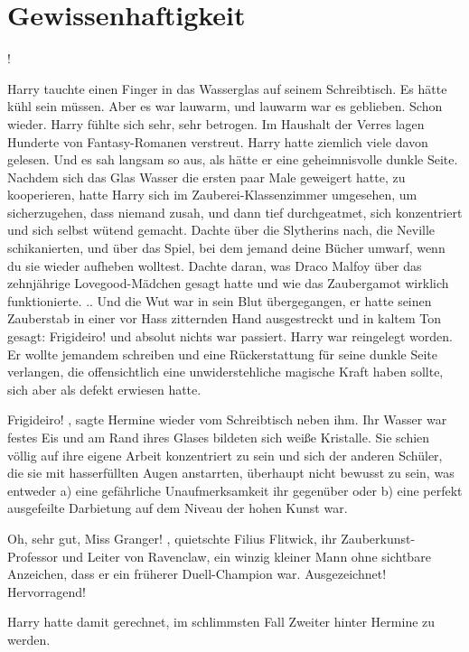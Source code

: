 \chapter{Gewissenhaftigkeit}

!\grqq{}

Harry tauchte einen Finger in das Wasserglas auf seinem Schreibtisch. Es hätte
kühl sein müssen. Aber es war lauwarm, und lauwarm war es geblieben. Schon
wieder. Harry fühlte sich sehr, sehr betrogen. Im Haushalt der Verres lagen
Hunderte von Fantasy-Romanen verstreut. Harry hatte ziemlich viele davon
gelesen. Und es sah langsam so aus, als hätte er eine geheimnisvolle dunkle
Seite. Nachdem sich das Glas Wasser die ersten paar Male geweigert hatte, zu
kooperieren, hatte Harry sich im Zauberei-Klassenzimmer umgesehen, um
sicherzugehen, dass niemand zusah, und dann tief durchgeatmet, sich konzentriert
und sich selbst wütend gemacht. Dachte über die Slytherins nach, die Neville
schikanierten, und über das Spiel, bei dem jemand deine Bücher umwarf, wenn du
sie wieder aufheben wolltest. Dachte daran, was Draco Malfoy über das
zehnjährige Lovegood-Mädchen gesagt hatte und wie das Zaubergamot wirklich
funktionierte. .. Und die Wut war in sein Blut übergegangen, er hatte seinen
Zauberstab in einer vor Hass zitternden Hand ausgestreckt und in kaltem Ton
gesagt: \glqq Frigideiro!\grqq{} und absolut nichts war passiert. Harry war
reingelegt worden. Er wollte jemandem schreiben und eine Rückerstattung für
seine dunkle Seite verlangen, die offensichtlich eine unwiderstehliche magische
Kraft haben sollte, sich aber als defekt erwiesen hatte.

\glqq Frigideiro!\grqq{} , sagte Hermine wieder vom Schreibtisch neben ihm. Ihr
Wasser war festes Eis und am Rand ihres Glases bildeten sich weiße Kristalle.
Sie schien völlig auf ihre eigene Arbeit konzentriert zu sein und sich der
anderen Schüler, die sie mit hasserfüllten Augen anstarrten, überhaupt nicht
bewusst zu sein, was entweder a) eine gefährliche Unaufmerksamkeit ihr gegenüber
oder b) eine perfekt ausgefeilte Darbietung auf dem Niveau der hohen Kunst war.

\glqq Oh, sehr gut, Miss Granger!\grqq{} , quietschte Filius Flitwick, ihr
Zauberkunst-Professor und Leiter von Ravenclaw, ein winzig kleiner Mann ohne
sichtbare Anzeichen, dass er ein früherer Duell-Champion war. \glqq
Ausgezeichnet! Hervorragend!\grqq{}

Harry hatte damit gerechnet, im schlimmsten Fall Zweiter hinter Hermine zu
werden.


